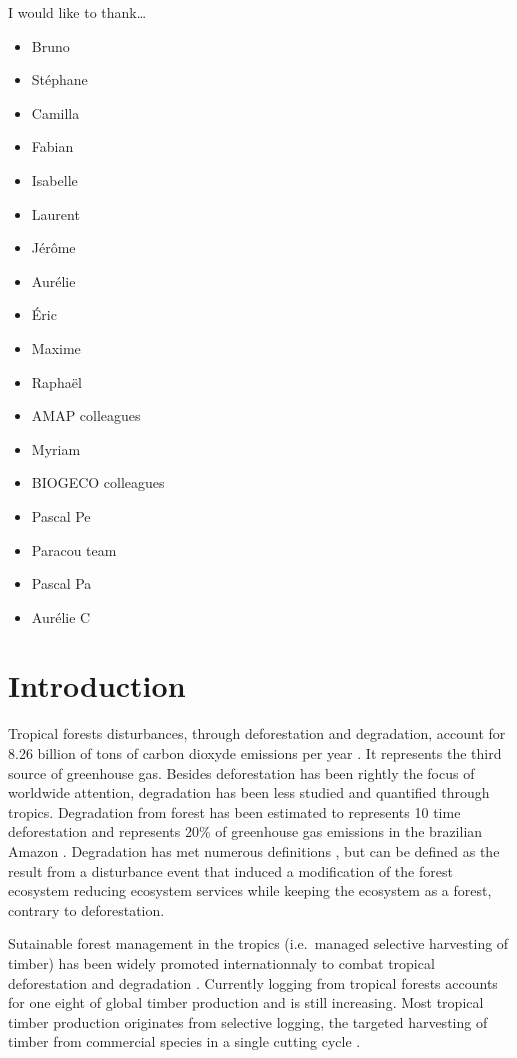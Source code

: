 \documentclass[12pt,]{article}
\providecommand{\tightlist}{%
\setlength{\itemsep}{0pt}\setlength{\parskip}{0pt}}
\let\oldsection\section
\renewcommand\section{\newpage\oldsection}
\theoremstyle{definition}
\theoremstyle{definition}
\theoremstyle{remark}
\begin{document}
I would like to thank\ldots{}

\begin{itemize}
\tightlist
\item
  Bruno
\item
  Stéphane
\item
  Camilla
\item
  Fabian
\item
  Isabelle
\item
  Laurent
\item
  Jérôme
\item
  Aurélie
\item
  Éric
\item
  Maxime
\item
  Raphaël
\item
  AMAP colleagues
\item
  Myriam
\item
  BIOGECO colleagues
\item
  Pascal Pe
\item
  Paracou team
\item
  Pascal Pa
\item
  Aurélie C
\end{itemize}

\section*{Introduction}\label{introduction}

Tropical forests disturbances, through deforestation and degradation,
account for 8.26 billion of tons of carbon dioxyde emissions per year
\citep{Pearson2017}. It represents the third source of greenhouse gas.
Besides deforestation has been rightly the focus of worldwide attention,
degradation has been less studied and quantified through tropics.
Degradation from forest has been estimated to represents 10 time
deforestation \citep{Herold2011} and represents 20\% of greenhouse gas
emissions in the brazilian Amazon \citep{Asner2005}. Degradation has met
numerous definitions \citep{Simula2009}, but can be defined as the
result from a disturbance event that induced a modification of the
forest ecosystem reducing ecosystem services while keeping the ecosystem
as a forest, contrary to deforestation.

Sutainable forest management in the tropics (i.e.~managed selective
harvesting of timber) has been widely promoted internationnaly to combat
tropical deforestation and degradation \citep{Zimmerman2012}. Currently
logging from tropical forests accounts for one eight of global timber
production \citep{Blaser2011} and is still increasing. Most tropical
timber production originates from selective logging, the targeted
harvesting of timber from commercial species in a single cutting cycle
\citep{Martin2015}.
\end{document}
